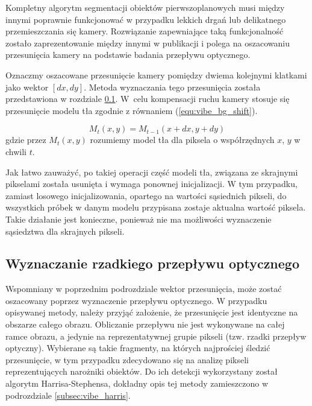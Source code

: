 Kompletny algorytm segmentacji obiektów pierwszoplanowych musi między innymi poprawnie funkcjonować w przypadku lekkich drgań lub delikatnego przemieszczania się kamery. Rozwiązanie zapewniające taką funkcjonalność zostało zaprezentowanie między innymi w publikacji \cite{kryjak_14_vibe} i polega na oszacowaniu przesunięcia kamery na podstawie badania przepływu optycznego. %

Oznaczmy oszacowane przesunięcie kamery pomiędzy dwiema kolejnymi klatkami jako wektor $[dx,dy]$. 
Metoda wyznaczania tego przesunięcia została przedstawiona w rozdziale \ref{subsec:vibe_of}. 
W~celu kompensacji ruchu kamery stosuje się przesunięcie modelu tła zgodnie z równaniem (\ref{equ:vibe_bg_shift}).

	\begin{equation}
	M_t(x,y) = M_{t-1}(x+dx,y+dy)
	\label{equ:vibe_bg_shift}
	\end{equation}
gdzie przez $M_t(x,y)$ rozumiemy model tła dla piksela o współrzędnych $x$, $y$ w chwili $t$.


Jak łatwo zauważyć, po takiej operacji część modeli tła, związana ze skrajnymi pikselami została usunięta i wymaga ponownej inicjalizacji. W tym przypadku, zamiast losowego inicjalizowania, opartego na wartości sąsiednich pikseli, do wszystkich próbek w danym modelu przypisana zostaje aktualna wartość piksela. Takie działanie jest konieczne, ponieważ nie ma możliwości wyznaczenie sąsiedztwa dla skrajnych pikseli.

\subsection{Wyznaczanie rzadkiego przepływu optycznego}
\label{subsec:vibe_of}

Wspomniany w poprzednim podrozdziale wektor przesunięcia, może zostać oszacowany poprzez wyznaczenie przepływu optycznego. 
W przypadku opisywanej metody, należy przyjąć założenie, że przesunięcie jest identyczne na obszarze całego obrazu. 
Obliczanie przepływu nie jest wykonywane na całej ramce obrazu, a jedynie na reprezentatywnej grupie pikseli (tzw. rzadki przepływ optyczny). 
Wybierane są takie fragmenty, na których najprościej śledzić przesunięcie, w tym przypadku zdecydowano się na analizę pikseli reprezentujących narożniki obiektów. 
Do ich detekcji wykorzystany został algorytm Harrisa-Stephensa, dokładny opis tej metody zamieszczono w podrozdziale \ref{subsec:vibe_harris}.


